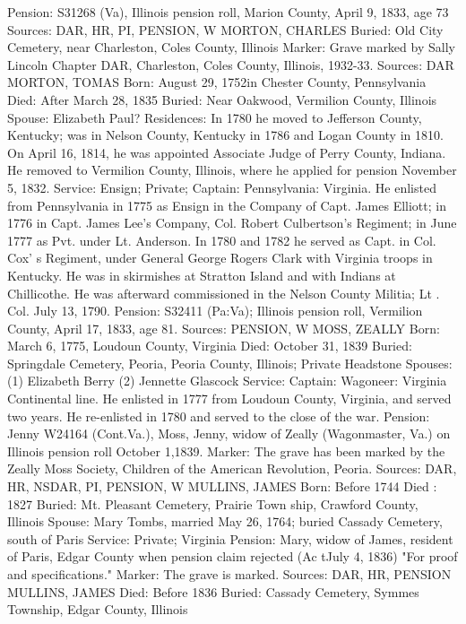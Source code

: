 Pension: S31268 (Va), Illinois pension roll, Marion County, April 9, 1833, age 73 
Sources: DAR, HR, PI, PENSION, W 
MORTON, CHARLES 
Buried: Old City Cemetery, near Charleston, Coles County, Illinois
Marker: Grave marked by Sally Lincoln Chapter DAR, Charleston, Coles County, Illinois, 1932-33.
Sources: DAR 
MORTON, TOMAS 
Born: August 29, 1752in Chester County, Pennsylvania
Died: After March 28, 1835
Buried: Near Oakwood, Vermilion County, Illinois
Spouse: Elizabeth Paul?
Residences: In 1780 he moved to Jefferson County, Kentucky; was in Nelson County, Kentucky in 1786 and Logan County in 1810. On April 16, 1814, he was appointed Associate Judge of Perry County, Indiana. He removed to Vermilion County, Illinois, where he applied for pension November 5, 1832. 
Service: Ensign; Private; Captain: Pennsylvania: Virginia. He enlisted from Pennsylvania in 1775 as Ensign in the Company of Capt. James Elliott; in 1776 in Capt. James Lee's Company, Col. Robert Culbertson's Regiment; in June 1777 as Pvt. under Lt. Anderson. In 1780 and 1782 he served as Capt. in Col. Cox' s Regiment, under General George Rogers Clark with Virginia troops in Kentucky. He was in skirmishes at Stratton Island and with Indians at Chillicothe. He was afterward commissioned in the Nelson County Militia; Lt . Col. July 13, 1790. 
Pension: S32411 (Pa:Va); Illinois pension roll, Vermilion County, April 17, 1833, age 81. 
Sources: PENSION, W 
MOSS, ZEALLY 
Born: March 6, 1775, Loudoun County, Virginia
Died: October 31, 1839
Buried: Springdale Cemetery, Peoria, Peoria County, Illinois; Private Headstone
Spouses: (1) Elizabeth Berry
	 (2) Jennette Glascock 
Service: Captain: Wagoneer: Virginia Continental line. He enlisted in 1777 from Loudoun County, Virginia, and served two years. He re-enlisted in 1780 and served to the close of the war. 
Pension: Jenny W24164 (Cont.Va.), Moss, Jenny, widow of Zeally (Wagonmaster, Va.) on Illinois pension roll October 1,1839.
Marker: The grave has been marked by the Zeally Moss Society, Children of the American Revolution, Peoria.
Sources: DAR, HR, NSDAR, PI, PENSION, W 
MULLINS, JAMES
Born: Before 1744 Died : 1827 
Buried: Mt. Pleasant Cemetery, Prairie Town ship, Crawford County, Illinois
Spouse: Mary Tombs, married May 26, 1764; buried Cassady Cemetery, south of Paris
Service: Private; Virginia 
Pension: Mary, widow of James, resident of Paris, Edgar County when pension claim rejected (Ac tJuly 4, 1836) "For proof and specifications."
Marker: The grave is marked.
Sources: DAR, HR, PENSION 
MULLINS, JAMES
Died: Before 1836
Buried: Cassady Cemetery, Symmes Township, Edgar County, Illinois
